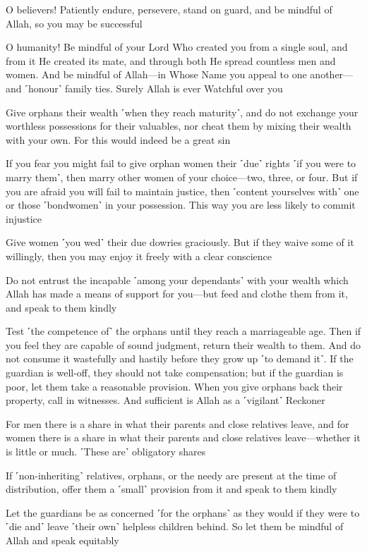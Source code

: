 O believers! Patiently endure, persevere, stand on guard, and be mindful of Allah, so you may be successful

O humanity! Be mindful of your Lord Who created you from a single soul, and from it He created its mate, and through both He spread countless men and women. And be mindful of Allah—in Whose Name you appeal to one another—and ˹honour˺ family ties. Surely Allah is ever Watchful over you

Give orphans their wealth ˹when they reach maturity˺, and do not exchange your worthless possessions for their valuables, nor cheat them by mixing their wealth with your own. For this would indeed be a great sin

If you fear you might fail to give orphan women their ˹due˺ rights ˹if you were to marry them˺, then marry other women of your choice—two, three, or four. But if you are afraid you will fail to maintain justice, then ˹content yourselves with˺ one or those ˹bondwomen˺ in your possession. This way you are less likely to commit injustice

Give women ˹you wed˺ their due dowries graciously. But if they waive some of it willingly, then you may enjoy it freely with a clear conscience

Do not entrust the incapable ˹among your dependants˺ with your wealth which Allah has made a means of support for you—but feed and clothe them from it, and speak to them kindly

Test ˹the competence of˺ the orphans until they reach a marriageable age. Then if you feel they are capable of sound judgment, return their wealth to them. And do not consume it wastefully and hastily before they grow up ˹to demand it˺. If the guardian is well-off, they should not take compensation; but if the guardian is poor, let them take a reasonable provision. When you give orphans back their property, call in witnesses. And sufficient is Allah as a ˹vigilant˺ Reckoner

For men there is a share in what their parents and close relatives leave, and for women there is a share in what their parents and close relatives leave—whether it is little or much. ˹These are˺ obligatory shares

If ˹non-inheriting˺ relatives, orphans, or the needy are present at the time of distribution, offer them a ˹small˺ provision from it and speak to them kindly

Let the guardians be as concerned ˹for the orphans˺ as they would if they were to ˹die and˺ leave ˹their own˺ helpless children behind. So let them be mindful of Allah and speak equitably

